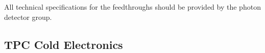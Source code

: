 All technical specifications for the feedthroughs should be provided by the photon detector group. 


\subsection{TPC Cold Electronics}
\label{sec:fdsp-pd-intfc-ce}



